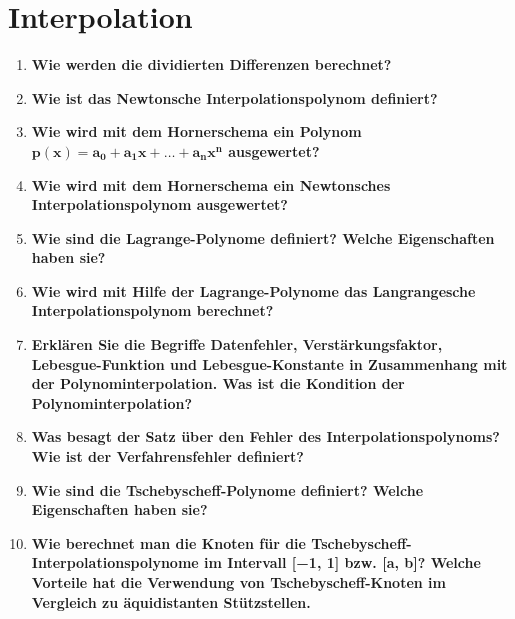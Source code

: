 \section{Interpolation}
	\begin{enumerate}
		\item \textbf{Wie werden die dividierten Differenzen berechnet?} \\
		
		\item \textbf{Wie ist das Newtonsche Interpolationspolynom definiert?} \\
		
		\item \textbf{Wie wird mit dem Hornerschema ein Polynom $\pmb{p(x)=a_0+a_1x+\dots +a_nx^n}$ ausgewertet?} \\
		
		\item \textbf{Wie wird mit dem Hornerschema ein Newtonsches Interpolationspolynom ausgewertet?} \\
		
		\item \textbf{Wie sind die Lagrange-Polynome definiert? Welche Eigenschaften haben sie?} \\
		
		\item \textbf{Wie wird mit Hilfe der Lagrange-Polynome das Langrangesche Interpolationspolynom berechnet?} \\
		
		\item \textbf{Erklären Sie die Begriffe Datenfehler, Verstärkungsfaktor, Lebesgue-Funktion und Lebesgue-Konstante in Zusammenhang mit der Polynominterpolation. Was ist die Kondition der Polynominterpolation?} \\
		
		\item \textbf{Was besagt der Satz über den Fehler des Interpolationspolynoms? Wie ist der Verfahrensfehler definiert?} \\
		
		\item \textbf{Wie sind die Tschebyscheff-Polynome definiert? Welche Eigenschaften haben sie?} \\
		
		\item \textbf{Wie berechnet man die Knoten für die Tschebyscheff-Interpolationspolynome im Intervall [−1, 1] bzw. [a, b]? Welche Vorteile hat die Verwendung von Tschebyscheff-Knoten im Vergleich zu äquidistanten Stützstellen.} \\
		

\end{enumerate}
